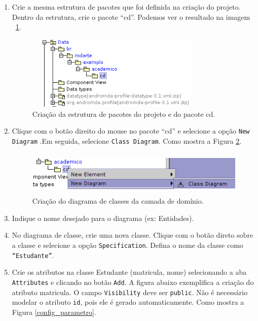 \begin{enumerate}
\item Crie a mesma estrutura de pacotes que foi definida na criação do projeto.
Dentro da estrutura, crie o pacote “cd”. Podemos ver o resultado na imagem
~\ref{cria_estrutura_pacotes}. 
\begin{figure}[H]
	\centering
	\includegraphics[width=250pt,height=100pt]{imgs/tutorial-mdarte-0000.png}
	\caption{Criação da estrutura de pacotes do projeto e do pacote cd.}
	\label{cria_estrutura_pacotes}
\end{figure}
\item Clique com o botão direito do mouse no pacote “cd” e selecione a opção
\texttt{New Diagram} .Em seguida, selecione \texttt{Class Diagram}. Como mostra
a Figura \ref{cria_diagrama_classe}.
\begin{figure}[H]
	\centering
	\includegraphics[width=400pt,height=60pt]{imgs/tutorial-mdarte-0001.png}
	\caption{Criação do diagrama de classes da camada de domínio.}
	\label{cria_diagrama_classe}
\end{figure}
	
\item Indique o nome desejado para o diagrama (ex: Entidades).
	
\item No diagrama de classe, crie uma nova classe. Clique com o botão direto
sobre a classe e selecione a opção \texttt{Specification}. Defina o nome da
classe como \texttt{“Estudante”}.
	
\item Crie os atributos na classe Estudante (matricula, nome) selecionando a aba
\texttt{Attributes} e clicando no botão \texttt{Add}. A figura abaixo
exemplifica a criação do atributo matricula. O campo \texttt{Visibility} deve
ser \texttt{public}. Não é necessário modelar o atributo \texttt{id}, pois ele é
gerado automaticamente. Como mostra a Figura \ref{config_parametro}.


\end{enumerate}
